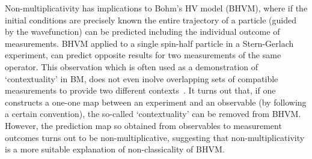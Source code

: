 \documentclass[british,aps,prl,superscriptaddress,nofootinbib,times,reprint]{revtex4-1}
\theoremstyle{plain}
\theoremstyle{plain}
\theoremstyle{definition}
\theoremstyle{remark}
\theoremstyle{remark}
\theoremstyle{remark}
\theoremstyle{plain}
\theoremstyle{plain}
\theoremstyle{plain}
\theoremstyle{definition}
\theoremstyle{definition}
\begin{document}
Non-multiplicativity has implications to Bohm's HV
model (BHVM), where if the initial conditions are
precisely known the entire trajectory of a
particle (guided by the wavefunction) can be
predicted including the individual outcome of
measurements.  BHVM applied to a single spin-half
particle in a Stern-Gerlach experiment, can
predict opposite results for two measurements of
the same operator.  This observation which is
often used as a demonstration of `contextuality'
in BM, does not even inolve  overlapping sets of
compatible measurements to provide two different
contexts~\cite{HardyCntxBM}.  It turns out that,
if one constructs  a one-one map between an
experiment and an observable (by following a
certain convention), the so-called `contextuality'
can be removed from BHVM.  However, the prediction
map so obtained from observables to measurement
outcomes turns out to be non-multiplicative,
suggesting that non-multiplicativity is a more
suitable explanation of non-classicality
of BHVM.
\end{document}
